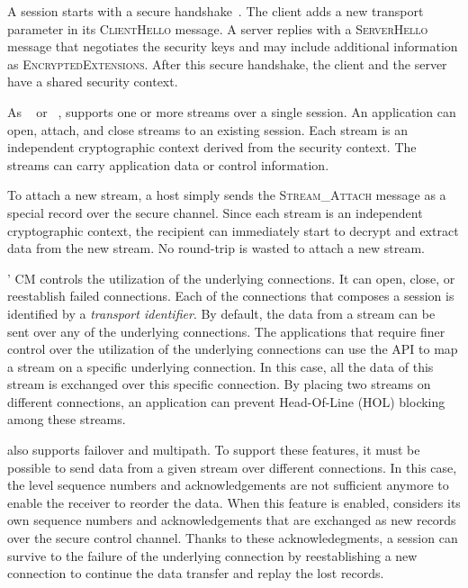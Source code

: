 A \tcpls session starts with a secure  handshake~\cite{rfc8446}. The
client adds a new \tcpls transport parameter in its \textsc{ClientHello}
message. A \tcpls server replies with a \textsc{ServerHello} message that
negotiates the security keys and may include additional \tcpls information as
\textsc{EncryptedExtensions}. After this secure handshake, the client and the
server have a shared security context.

As \sctp~\cite{rfc4960} or \quic~\cite{draft-ietf-quic-transport}, \tcpls
supports one or more streams over a single \tcpls session. An application can
open, attach, and close streams to an existing \tcpls session. Each stream is an
independent cryptographic context derived from the \tcpls security context. The
\tcpls streams can carry application data or control information.


To attach a new stream, a host simply sends the \textsc{Stream\_Attach} message
as a special \tls record over the secure channel. Since each stream is an
independent cryptographic context, the recipient can immediately start to
decrypt and extract data from the new stream. No round-trip is wasted to attach
a new stream.

\tcpls' CM controls the utilization of the underlying \tcp connections. It can open, close, or reestablish failed \tcp connections. Each of the connections that composes a \tcpls session is identified by a \emph{transport identifier}. By default, the data from a stream can be sent over any of the underlying \tcp connections. The applications that require finer control over the utilization of the underlying \tcp connections can use the \tcpls API to map a stream on a specific underlying connection. In this case, all the data of this stream is exchanged over this specific connection. By placing two streams on different connections, an application can prevent Head-Of-Line (HOL) blocking among these streams.

\tcpls also supports failover and multipath. To support these features, it must
be possible to send data from a given stream over different \tcp connections. In
this case, the \tcp level sequence numbers and acknowledgements are not
sufficient anymore to enable the receiver to reorder the data. When this feature
is enabled, \tcpls considers its own sequence numbers and acknowledgements that are exchanged as new \tls records over the secure control channel.  Thanks to these \tcpls acknowledegments, a \tcpls session can survive to the failure of the underlying \tcp connection by reestablishing a new \tcp connection to continue the data transfer and replay the lost records.


